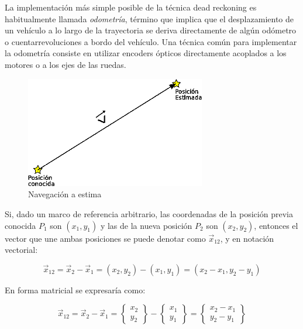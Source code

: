 

  La implementaci\'on m\'as simple posible de la t\'ecnica dead
  reckoning es habitualmente llamada \emph{odometr\'ia}, t\'ermino que
  implica que el desplazamiento de un veh\'iculo a lo largo de la
  \gls{trayectoria} se deriva directamente de alg\'un od\'ometro o
  cuentarrevoluciones a bordo del veh\'iculo. Una t\'ecnica com\'un
  para implementar la odometr\'ia consiste en utilizar encoders
  \'opticos directamente acoplados a los motores o a los ejes de las
  ruedas.


\begin{figure}[!h]
  \centering
  \includegraphics[keepaspectratio,width=0.7\textwidth]{./Imagenes/06.00.navegacion/dead-reckoning.png}
  \caption{Navegaci\'on a estima \cite{Salazar_nav_aerea}}
  \label{fig:dead-reckoning}
\end{figure}


Si, dado un marco de referencia arbitrario, las coordenadas de la posici\'on previa conocida $P_1$ son $(x_1, y_1)$ y las de la nueva posici\'on $P_2$ son $(x_2, y_2)$, entonces el vector que une ambas posiciones se puede denotar como $\vec x_{12}$, y en notaci\'on vectorial:


  \begin{equation}
\vec x_{12} = \vec x_2 - \vec x_1 = (x_2, y_2) - (x_1, y_1) = (x_2 - x_1, y_2 - y_1)
    \label{eq:dead-reckoning-vtor-posicion}
  \end{equation}



En forma matricial se expresar\'ia como:


\begin{equation}\label{eq:dead-reckoning-expresion-matricial}
 \vec x_{12} = \vec x_2 - \vec x_1 = 
\left\{ \begin{array}{c} x_2 \\ y_2 \end{array} \right\} 
- \left\{ \begin{array}{c} x_1 \\ y_1 \end{array} \right\} 
=
\left\{ \begin{array}{c} x_2 - x_1 \\ y_2 - y_1 \end{array} \right\}
\end{equation}

